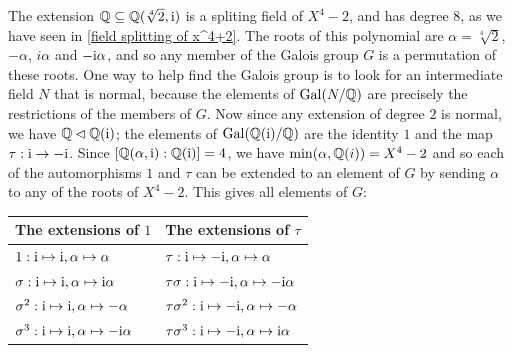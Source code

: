 \begin{example}
The extension $\mathbb{Q}\subseteq\mathbb{Q}(\sqrt[4]{2},\mathrm{i})$ is a spliting field of $X^4-2$, and has degree $8$, as we have seen in \cref{field splitting of x^4+2}. The roots of this polynomial are $\alpha=\sqrt[4]{2}$, $-\alpha$, $i\alpha$ and $-\mathrm{i}\alpha$, and so any member of the Galois group $G$ is a permutation of these roots. One way to help find the Galois group is to look for an intermediate field $N$ that is normal, because the elements of $\mathrm{Gal}(N/\mathbb{Q})$ are precisely the restrictions of the members of $G$. Now since any extension of degree $2$ is normal, we have $\mathbb{Q}\lhd\mathbb{Q}(\mathrm{i})$; the elements of $\mathrm{Gal}(\mathbb{Q}(\mathrm{i})/\mathbb{Q})$ are the identity $1$ and the map $\tau:\mathrm{i}\to-\mathrm{i}$. Since $[\mathbb{Q}(\alpha,\mathrm{i}):\mathbb{Q}(\mathrm{i})]=4$, we have $\min(\alpha,\mathbb{Q}(i))=X^4-2$ and so each of the automorphisms $1$ and $\tau$ can be extended to an element of $G$ by sending $\alpha$ to any of the roots of $X^4-2$. This gives all elements of $G$:
\begin{table}[htbp]
\centering
\begin{tabular}{l|l}
\hline
The extensions of $1$& The extensions of $\tau$\\
\hline
$1:\mathrm{i}\mapsto \mathrm{i},\alpha\mapsto\alpha$&$\tau:\mathrm{i}\mapsto-\mathrm{i},\alpha\mapsto \alpha$\\
$\sigma:\mathrm{i}\mapsto \mathrm{i},\alpha\mapsto \mathrm{i}\alpha$&$\tau\sigma:\mathrm{i}\mapsto-\mathrm{i},\alpha\mapsto -\mathrm{i}\alpha$\\
$\sigma^2:\mathrm{i}\mapsto \mathrm{i},\alpha\mapsto-\alpha$&$\tau\sigma^2:\mathrm{i}\mapsto-\mathrm{i},\alpha\mapsto-\alpha$\\
$\sigma^3:\mathrm{i}\mapsto \mathrm{i},\alpha\mapsto-\mathrm{i}\alpha$&$\tau\sigma^3:\mathrm{i}\mapsto-\mathrm{i},\alpha\mapsto \mathrm{i}\alpha$\\
\hline
\end{tabular}
\end{table}


\end{example}
